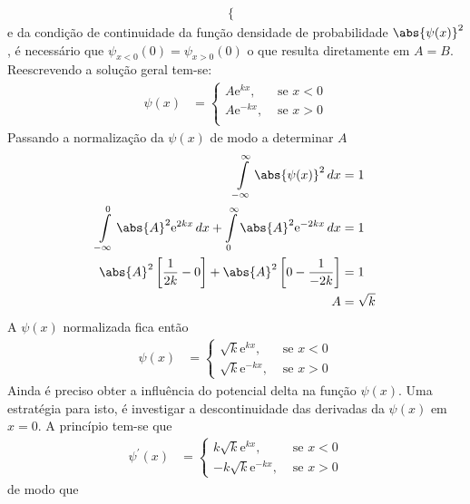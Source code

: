 \begin{prob}
\begin{sol}
\begin{enumerate}[label=\alph *)]
\begin{align}
\begin{cases}
						\end{cases}
					\end{align}
					e da condição de continuidade da função densidade de probabilidade $\abs{\psi(x)}^{2}$, é necessário que $\psi_{x<0}(0)=\psi_{x>0}(0)$ o que resulta diretamente em $A=B$. Reescrevendo a solução geral tem-se:
					\begin{align}
						\psi(x) &=
							\begin{cases}
								A \mathrm{e}^{kx}, &\text{ se }x<0\\
								A \mathrm{e}^{-kx}, &\text{ se }x>0\\
							\end{cases}
					\end{align}
					Passando a normalização da $\psi(x)$ de modo a determinar $A$
					\begin{align}
							\begin{split}
								\int\limits_{-\infty}^{\infty}\abs{\psi(x)}^{2}\,d{x} &= 1\\
								\int\limits_{-\infty}^{0}\abs{A}^{2}\mathrm{e}^{2kx}\,d{x}+\int\limits_{0}^{\infty}\abs{A}^{2}\mathrm{e}^{-2kx}\,d{x} &= 1\\
								\abs{A}^{2}\left[\frac{1}{2k}-0\right]+\abs{A}^{2}\left[0-\frac{1}{-2k}\right] &= 1\\
								A &= \sqrt{k}
							\end{split}
					\end{align}
					A $\psi(x)$ normalizada fica então
					\begin{align}
						\psi(x) &=
						\begin{cases}
							\sqrt{k}\mathrm{e}^{kx}, &\text{ se }x<0\\
							\sqrt{k}\mathrm{e}^{-kx}, &\text{ se }x>0
						\end{cases}
					\end{align}
					Ainda é preciso obter a influência do potencial delta na função $\psi(x)$. Uma estratégia para isto, é investigar a descontinuidade das derivadas da $\psi(x)$ em $x=0$. A princípio tem-se que
					\begin{align}
						\psi^{\prime}(x) &=
						\begin{cases}
							k\sqrt{k}\mathrm{e}^{kx}, &\text{ se }x<0\\
							-k\sqrt{k}\mathrm{e}^{-kx}, &\text{ se }x>0
						\end{cases}
					\end{align}
					de modo que
					\begin{align}
							\begin{split}

\end{split}
\end{align}
\end{enumerate}
\end{sol}
\end{prob}

